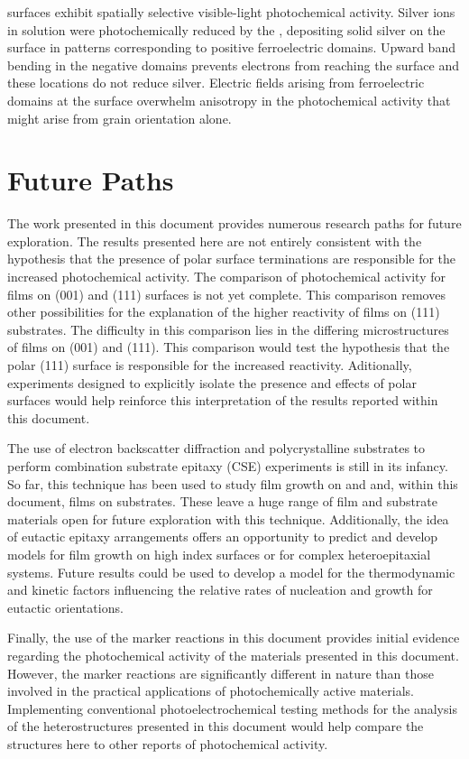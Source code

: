  surfaces exhibit spatially selective visible-light photochemical activity.
Silver ions in solution were photochemically reduced by the , depositing solid
silver on the surface in patterns corresponding to positive ferroelectric domains. Upward
band bending in the negative domains prevents electrons from reaching the surface and
these locations do not reduce silver. Electric fields arising from ferroelectric domains
at the surface overwhelm anisotropy in the photochemical activity that might arise from
grain orientation alone.

\section{Future Paths}
\label{sec:conclusions.future.paths}

The work presented in this document provides numerous research paths for future
exploration. The results presented here are not entirely consistent with the hypothesis 
that the presence of
polar surface terminations are responsible for the increased photochemical activity. The
comparison of photochemical activity for  films on (001) and
(111) surfaces is not yet complete. This comparison removes other possibilities
for the explanation of the higher reactivity of films on (111) substrates. The
difficulty in this comparison lies in the differing microstructures of films on
(001) and (111). This comparison would test the hypothesis that the
polar (111) surface is responsible for the increased reactivity. Aditionally,
experiments designed to explicitly isolate the presence and effects of polar surfaces
would help reinforce this interpretation of the results reported within this document.

The use of electron backscatter diffraction  and polycrystalline substrates to perform
combination substrate epitaxy (CSE) experiments is still in its infancy. So far, this
technique has been used to study  film growth on  and  and,
within this document,  films on  substrates. These leave a huge
range of film and substrate materials open for future exploration with this technique.
Additionally, the idea of eutactic epitaxy arrangements offers an opportunity to predict
and develop models for film growth on high index surfaces or for complex heteroepitaxial
systems. Future results could be used to develop a model for the thermodynamic and kinetic
factors influencing the relative rates of nucleation and growth for eutactic orientations.

Finally, the use of the marker reactions in this document provides initial evidence
regarding the photochemical activity of the materials presented in this document. However,
the marker reactions are significantly different in nature than those involved in the
practical applications of photochemically active materials. Implementing conventional
photoelectrochemical testing methods for the analysis of the heterostructures presented in
this document would help compare the structures here to other reports of photochemical
activity. 
